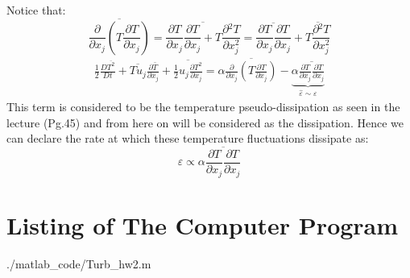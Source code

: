 \documentclass[11pt, a4paper]{article}
\newcommand{\parder}[2]{\frac{\partial {#1}}{\partial {#2}}}
\begin{document}
Notice that:
\begin{equation}
    \overline{\parder{}{x_j}\left(T\parder{T}{x_j}\right)}=\overline{\parder{T}{x_j}\parder{T}{x_j}+T\parder{^2T}{x_j^2}}=\overline{\parder{T}{x_j}\parder{T}{x_j}}+\overline{T\parder{^2T}{x_j^2}}
\end{equation}
\begin{equation}
    \begin{array}{c}
        \displaystyle\frac{1}{2}\frac{D\overline{T^2}}{Dt}+\overline{Tu_j}\parder{\bar{T}}{x_j}+\overline{\frac{1}{2}u_j\parder{T^2}{x_j}}=\alpha\overline{\parder{}{x_j}\left(T\parder{T}{x_j}\right)}-\underbrace{\alpha\overline{\parder{T}{x_j}\parder{T}{x_j}}}_{\hat{\varepsilon}\sim\varepsilon}
    \end{array}
\end{equation}
This term is considered to be the temperature pseudo-dissipation as seen in the lecture (Pg.45) and from here on will be considered as the dissipation. Hence we can declare the rate at which these temperature fluctuations dissipate as:
\begin{equation}
    \boxed{\varepsilon\propto\alpha\overline{\parder{T}{x_j}\parder{T}{x_j}}}
\end{equation}

\newpage
\appendix
\section{Listing of The Computer Program}
\begin{lstinputlisting}[captionpos=b,stringstyle=\color{magenta},frame=single, numbers=left, style=MatLab-editor, basicstyle=\mlttfamily\small, caption={Code for Q1},mlshowsectionrules=true]{./matlab_code/Turb_hw2.m}
\end{lstinputlisting}
\end{document}
